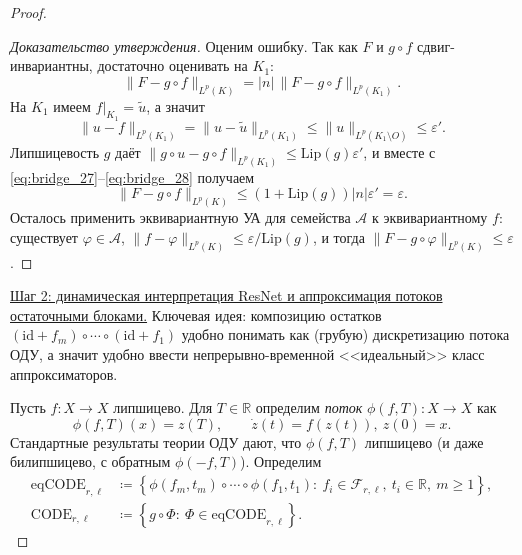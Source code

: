 \documentclass[../NDCNNAI_main.tex]{subfiles}
\begin{document}
\begin{proof}
\begin{proof}[Доказательство утверждения]
Оценим ошибку. Так как $F$ и $g\circ f$ сдвиг-инвариантны, достаточно оценивать на $K_1$:
\begin{equation}
\|F-g\circ f\|_{L^p(K)} = |n|\,\|F-g\circ f\|_{L^p(K_1)}.
\label{eq:bridge_28}
\end{equation}
На $K_1$ имеем $f|_{K_1}=\tilde u$, а значит
\[
\|u-f\|_{L^p(K_1)}=\|u-\tilde u\|_{L^p(K_1)}\le \|u\|_{L^p(K_1\setminus O)}\le \varepsilon'.
\]
Липшицевость $g$ даёт $\|g\circ u-g\circ f\|_{L^p(K_1)}\le \mathrm{Lip}(g)\varepsilon'$,
и вместе с \eqref{eq:bridge_27}--\eqref{eq:bridge_28} получаем
\[
\|F-g\circ f\|_{L^p(K)}\le (1+\mathrm{Lip}(g))|n|\varepsilon'=\varepsilon.
\]
Осталось применить эквивариантную УА для семейства $\mathcal{A}$ к эквивариантному $f$: существует $\varphi\in\mathcal{A}$,
$\|f-\varphi\|_{L^p(K)}\le \varepsilon/\mathrm{Lip}(g)$, и тогда $\|F-g\circ\varphi\|_{L^p(K)}\le \varepsilon$.  
\end{proof}
\underline{Шаг 2: динамическая интерпретация ResNet и аппроксимация потоков остаточными блоками.}
Ключевая идея: композицию остатков
\(
(\mathrm{id}+f_m)\circ\cdots\circ(\mathrm{id}+f_1)
\)
удобно понимать как (грубую) дискретизацию потока ОДУ, а значит удобно ввести непрерывно-временной <<идеальный>> класс аппроксиматоров.

Пусть $f\colon X\to X$ липшицево. Для $T\in\mathbb{R}$ определим \emph{поток} $\phi(f,T)\colon X\to X$ как
\[
\phi(f,T)(x)=z(T),\qquad \dot z(t)=f(z(t)),\ z(0)=x.
\]
Стандартные результаты теории ОДУ дают, что $\phi(f,T)$ липшицево (и даже билипшицево, с обратным $\phi(-f,T)$).
Определим
\begin{align}
\mathrm{eqCODE}_{r,\ell}
&\coloneq \left\{\phi(f_m,t_m)\circ\cdots\circ\phi(f_1,t_1):\ f_i\in\mathcal{F}_{r,\ell},\ t_i\in\mathbb{R},\ m\ge 1\right\},\\
\mathrm{CODE}_{r,\ell}
&\coloneq \left\{g\circ \Phi:\ \Phi\in \mathrm{eqCODE}_{r,\ell}\right\}.
\end{align}


\end{proof}
\end{document}
